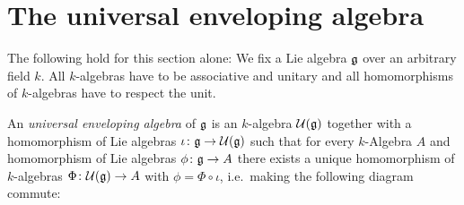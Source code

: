 \section{The universal enveloping algebra}
The following hold for this section alone: We fix a Lie algebra $\mathfrak{g}$ over an arbitrary field $k$. All $k$-algebras have to be associative and unitary and all homomorphisms of $k$-algebras have to respect the unit.


\begin{defi}
 An \emph{universal enveloping algebra} of $\mathfrak{g}$ is an $k$-algebra $\mathcal{U}(\mathfrak{g})$ together with a homomorphism of Lie algebras $\iota \colon \mathfrak{g} \to \mathcal{U}(\mathfrak{g})$ such that for every $k$-Algebra $A$ and homomorphism of Lie algebras $\phi \colon \mathfrak{g} \to A$ there exists a unique homomorphism of $k$-algebras $\Phi \colon \mathcal{U}(\mathfrak{g}) \to A$ with $\phi = \Phi \circ \iota$, i.e.\ making the following diagram commute:
 \begin{center}
 \end{center}
\end{defi}
